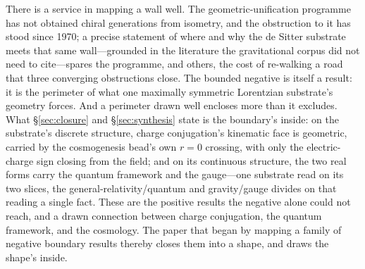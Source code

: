 \documentclass[11pt]{article}
\theoremstyle{plain}
\theoremstyle{remark}
\begin{document}
There is a service in mapping a wall well. The geometric-unification programme has not obtained chiral generations from isometry, and the obstruction to it has stood since 1970; a precise statement of where and why the de Sitter substrate meets that same wall---grounded in the literature the gravitational corpus did not need to cite---spares the programme, and others, the cost of re-walking a road that three converging obstructions close. The bounded negative is itself a result: it is the perimeter of what one maximally symmetric Lorentzian substrate's geometry forces. And a perimeter drawn well encloses more than it excludes. What \S\ref{sec:closure} and \S\ref{sec:synthesis} state is the boundary's inside: on the substrate's discrete structure, charge conjugation's kinematic face is geometric, carried by the cosmogenesis bead's own $r=0$ crossing, with only the electric-charge sign closing from the field; and on its continuous structure, the two real forms carry the quantum framework and the gauge---one substrate read on its two slices, the general-relativity/quantum and gravity/gauge divides on that reading a single fact. These are the positive results the negative alone could not reach, and a drawn connection between charge conjugation, the quantum framework, and the cosmology. The paper that began by mapping a family of negative boundary results thereby closes them into a shape, and draws the shape's inside.
\end{document}
